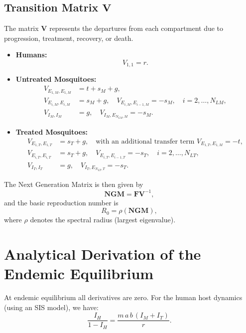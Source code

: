 \documentclass[12pt]{article}
\begin{document}
\subsection{Transition Matrix \(\mathbf{V}\)}
The matrix \(\mathbf{V}\) represents the departures from each compartment due to progression, treatment, recovery, or death.
\begin{itemize}
    \item \textbf{Humans:} 
    \[
    V_{1,1} = r.
    \]
    
    \item \textbf{Untreated Mosquitoes:}
    \begin{align*}
    V_{E_{1,M},E_{1,M}} &= t+ s_M + g,\\[1mm]
    V_{E_{i,M},E_{i,M}} &= s_M + g, \quad V_{E_{i,M},E_{i-1,M}} = - s_M, \quad i=2,\dots,N_{LM},\\[1mm]
    V_{I_M,I_M} &= g, \quad V_{I_M,E_{N_{LM},M}} = - s_M.
    \end{align*}
    
    \item \textbf{Treated Mosquitoes:}
    \begin{align*}
    V_{E_{1,T},E_{1,T}} &= s_T + g, \quad \text{with an additional transfer term }V_{E_{1,T},E_{1,M}} = -t,\\[1mm]
    V_{E_{i,T},E_{i,T}} &= s_T + g, \quad V_{E_{i,T},E_{i-1,T}} = - s_T, \quad i=2,\dots,N_{LT},\\[1mm]
    V_{I_T,I_T} &= g, \quad V_{I_T,E_{N_{LT},T}} = - s_T.
    \end{align*}
\end{itemize}

The Next Generation Matrix is then given by
\[
\mathbf{NGM} = \mathbf{F} \mathbf{V}^{-1},
\]
and the basic reproduction number is
\[
R_0 = \rho(\mathbf{NGM}),
\]
where \(\rho\) denotes the spectral radius (largest eigenvalue).

\section{Analytical Derivation of the Endemic Equilibrium}
At endemic equilibrium all derivatives are zero. For the human host dynamics (using an SIS model), we have:
\begin{equation}
\frac{I_H}{1-I_H} = \frac{m\,a\,b\,(I_M+I_T)}{r}.
\end{equation}
\end{document}
